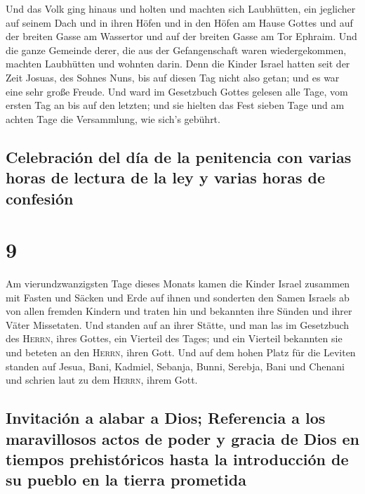  Und das Volk ging hinaus und holten und machten sich
Laubhütten, ein jeglicher auf seinem Dach und in ihren Höfen und in den
Höfen am Hause Gottes und auf der breiten Gasse am Wassertor und auf der
breiten Gasse am Tor Ephraim.  Und die ganze Gemeinde
derer, die aus der Gefangenschaft waren wiedergekommen, machten
Laubhütten und wohnten darin. Denn die Kinder Israel hatten seit der
Zeit Josuas, des Sohnes Nuns, bis auf diesen Tag nicht also getan; und
es war eine sehr große Freude.  Und ward im Gesetzbuch
Gottes gelesen alle Tage, vom ersten Tag an bis auf den letzten; und sie
hielten das Fest sieben Tage und am achten Tage die Versammlung, wie
sich's gebührt.

\hypertarget{celebraciuxf3n-del-duxeda-de-la-penitencia-con-varias-horas-de-lectura-de-la-ley-y-varias-horas-de-confesiuxf3n}{%
\subsection{Celebración del día de la penitencia con varias horas de
lectura de la ley y varias horas de
confesión}\label{celebraciuxf3n-del-duxeda-de-la-penitencia-con-varias-horas-de-lectura-de-la-ley-y-varias-horas-de-confesiuxf3n}}

\hypertarget{section-8}{%
\section{9}\label{section-8}}

 Am vierundzwanzigsten Tage dieses Monats kamen die Kinder
Israel zusammen mit Fasten und Säcken und Erde auf ihnen 
und sonderten den Samen Israels ab von allen fremden Kindern und traten
hin und bekannten ihre Sünden und ihrer Väter Missetaten. 
Und standen auf an ihrer Stätte, und man las im Gesetzbuch des
\textsc{Herrn}, ihres Gottes, ein Vierteil des Tages; und ein Vierteil
bekannten sie und beteten an den \textsc{Herrn}, ihren Gott.
 Und auf dem hohen Platz für die Leviten standen auf
Jesua, Bani, Kadmiel, Sebanja, Bunni, Serebja, Bani und Chenani und
schrien laut zu dem \textsc{Herrn}, ihrem Gott.

\hypertarget{invitaciuxf3n-a-alabar-a-dios-referencia-a-los-maravillosos-actos-de-poder-y-gracia-de-dios-en-tiempos-prehistuxf3ricos-hasta-la-introducciuxf3n-de-su-pueblo-en-la-tierra-prometida}{%
\subsection{Invitación a alabar a Dios; Referencia a los maravillosos
actos de poder y gracia de Dios en tiempos prehistóricos hasta la
introducción de su pueblo en la tierra
prometida}\label{invitaciuxf3n-a-alabar-a-dios-referencia-a-los-maravillosos-actos-de-poder-y-gracia-de-dios-en-tiempos-prehistuxf3ricos-hasta-la-introducciuxf3n-de-su-pueblo-en-la-tierra-prometida}}

